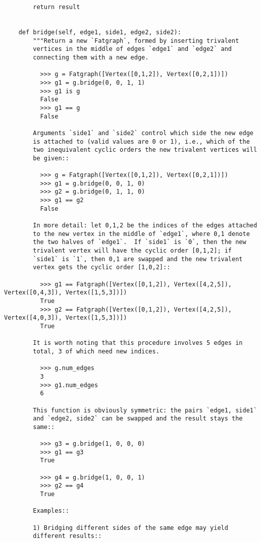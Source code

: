 \begin{lstlisting}
        return result
        

    def bridge(self, edge1, side1, edge2, side2):
        """Return a new `Fatgraph`, formed by inserting trivalent
        vertices in the middle of edges `edge1` and `edge2` and
        connecting them with a new edge.

          >>> g = Fatgraph([Vertex([0,1,2]), Vertex([0,2,1])])
          >>> g1 = g.bridge(0, 0, 1, 1)
          >>> g1 is g
          False
          >>> g1 == g
          False
          
        Arguments `side1` and `side2` control which side the new edge
        is attached to (valid values are 0 or 1), i.e., which of the
        two inequivalent cyclic orders the new trivalent vertices will
        be given::
        
          >>> g = Fatgraph([Vertex([0,1,2]), Vertex([0,2,1])])
          >>> g1 = g.bridge(0, 0, 1, 0)
          >>> g2 = g.bridge(0, 1, 1, 0)
          >>> g1 == g2
          False

        In more detail: let 0,1,2 be the indices of the edges attached
        to the new vertex in the middle of `edge1`, where 0,1 denote
        the two halves of `edge1`.  If `side1` is `0`, then the new
        trivalent vertex will have the cyclic order [0,1,2]; if
        `side1` is `1`, then 0,1 are swapped and the new trivalent
        vertex gets the cyclic order [1,0,2]::

          >>> g1 == Fatgraph([Vertex([0,1,2]), Vertex([4,2,5]), Vertex([0,4,3]), Vertex([1,5,3])])
          True
          >>> g2 == Fatgraph([Vertex([0,1,2]), Vertex([4,2,5]), Vertex([4,0,3]), Vertex([1,5,3])])
          True

        It is worth noting that this procedure involves 5 edges in
        total, 3 of which need new indices.

          >>> g.num_edges
          3
          >>> g1.num_edges
          6
          
        This function is obviously symmetric: the pairs `edge1, side1`
        and `edge2, side2` can be swapped and the result stays the
        same::

          >>> g3 = g.bridge(1, 0, 0, 0)
          >>> g1 == g3
          True

          >>> g4 = g.bridge(1, 0, 0, 1)
          >>> g2 == g4
          True

        Examples::
        
        1) Bridging different sides of the same edge may yield
        different results::
        

\end{lstlisting}
